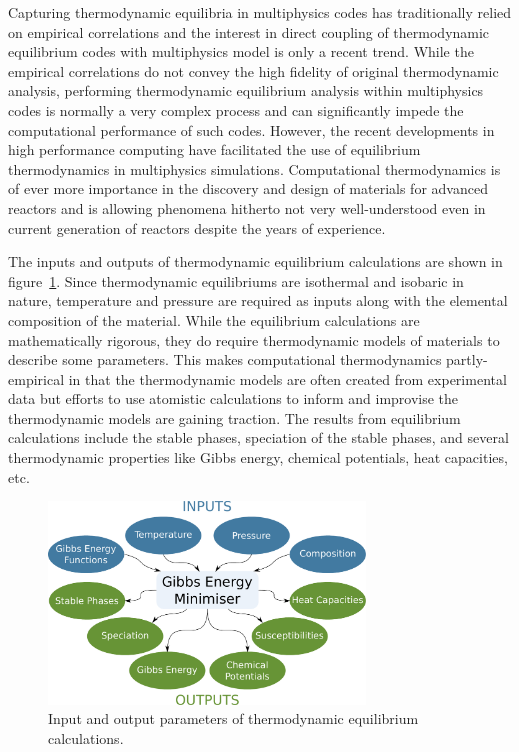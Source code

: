 	Capturing thermodynamic equilibria in multiphysics codes has traditionally relied on empirical correlations and the interest in direct coupling of thermodynamic equilibrium codes with multiphysics model is only a recent trend. While the empirical correlations do not convey the high fidelity of original thermodynamic analysis, performing thermodynamic equilibrium analysis within multiphysics codes is normally a very complex process and can significantly impede the computational performance of such codes. However, the recent developments in high performance computing have facilitated the use of equilibrium thermodynamics in multiphysics  simulations. Computational thermodynamics is of ever more importance in the discovery and design of materials for advanced reactors and is allowing phenomena hitherto not very well-understood even in current generation of reactors despite the years of experience.
	
	
	The inputs and outputs of thermodynamic equilibrium calculations are shown in figure~\ref{fig:Thermod}. Since thermodynamic equilibriums are isothermal and isobaric in nature, temperature and pressure are required as inputs along with the elemental composition of the material. While the equilibrium calculations are mathematically rigorous, they do require thermodynamic models of materials to describe some parameters. This makes computational thermodynamics partly-empirical in that the thermodynamic models are often created from experimental data but efforts to use atomistic calculations to inform and improvise the thermodynamic models are gaining traction. The results from equilibrium calculations include the stable phases, speciation of the stable phases, and several thermodynamic properties like Gibbs energy, chemical potentials, heat capacities, etc.
	\begin{figure}[ht]
        		\centering
        		\includegraphics[width=0.75\textwidth]{figures/chapter-1/thermodynamics.pdf}
        		\caption{Input and output parameters of thermodynamic equilibrium calculations.}
        		\label{fig:Thermod}
    	\end{figure}
	
